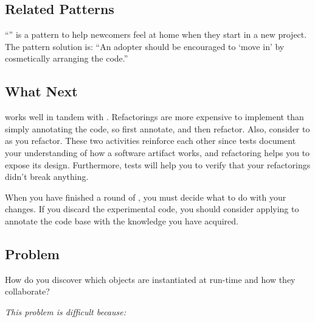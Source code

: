 \documentclass[a4paper,10pt,twoside]{book}
\begin{document}
\subsection*{Related Patterns}

``'' \cite{Tayl00a} is a pattern to help newcomers feel at home when they start in a new project. The pattern solution is: ``An adopter should be encouraged to `move in' by cosmetically arranging the code.'' 

\subsection*{What Next}

 works well in tandem with . Refactorings are more expensive to implement than simply annotating the code, so first annotate, and then refactor. Also, consider to  as you refactor. These two activities reinforce each other since tests document your understanding of how a software artifact works, and refactoring helps you to expose its design. Furthermore, tests will help you to verify that your refactorings didn't break anything.

When you have finished a round of , you must decide what to do with your changes. If you discard the experimental code, you should consider applying  to annotate the code base with the knowledge you have acquired.




\subsection*{Problem}

How do you discover which objects are instantiated at run-time and how they collaborate?

\emph{This problem is difficult because:}
\end{document}

